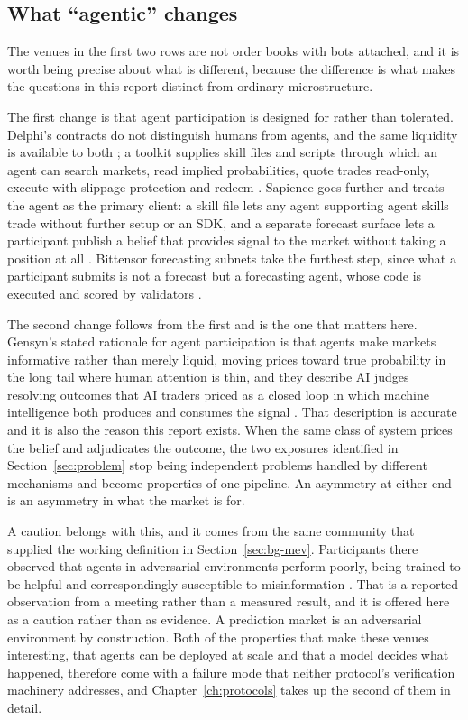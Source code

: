 \subsection*{What ``agentic'' changes}

The venues in the first two rows are not order books with bots attached, and it is worth
being precise about what is different, because the difference is what makes the questions in
this report distinct from ordinary microstructure.

The first change is that agent participation is designed for rather than tolerated. Delphi's
contracts do not distinguish humans from agents, and the same liquidity is available to both
\cite{gensyn2026delphi}; a toolkit supplies skill files and scripts through which an agent
can search markets, read implied probabilities, quote trades read-only, execute with slippage
protection and redeem \cite{gensyn2026att}. Sapience goes further and treats the agent as the
primary client: a skill file lets any agent supporting agent skills trade without further
setup or an SDK, and a separate forecast surface lets
a participant publish a belief that provides signal to the market without taking a position
at all \cite{sapience2026docs}. Bittensor forecasting subnets take the furthest step, since
what a participant submits is not a forecast but a forecasting agent, whose code is executed
and scored by validators \cite{numinousgithub}.

The second change follows from the first and is the one that matters here. Gensyn's stated
rationale for agent participation is that agents make markets informative rather than merely
liquid, moving prices toward true probability in the long tail where human attention is thin,
and they describe AI judges resolving outcomes that AI traders priced as a closed loop in
which machine intelligence both produces and consumes the signal \cite{gensyn2026delphi}.
That description is accurate and it is also the reason this report exists. When the same
class of system prices the belief and adjudicates the outcome, the two exposures identified
in Section~\ref{sec:problem} stop being independent problems handled by different mechanisms
and become properties of one pipeline. An asymmetry at either end is an asymmetry in what the
market is for.

A caution belongs with this, and it comes from the same community that supplied the working
definition in Section~\ref{sec:bg-mev}. Participants there observed that agents in
adversarial environments perform poorly, being trained to be helpful and correspondingly
susceptible to misinformation \cite{mevsbc2026breakout}. That is a reported observation from
a meeting rather than a measured result, and it is offered here as a caution rather than as
evidence. A
prediction market is an adversarial environment by construction. Both of the properties that
make these venues interesting, that agents can be deployed at scale and that a model decides
what happened, therefore come with a failure mode that neither protocol's verification
machinery addresses, and Chapter~\ref{ch:protocols} takes up the second of them in detail.

